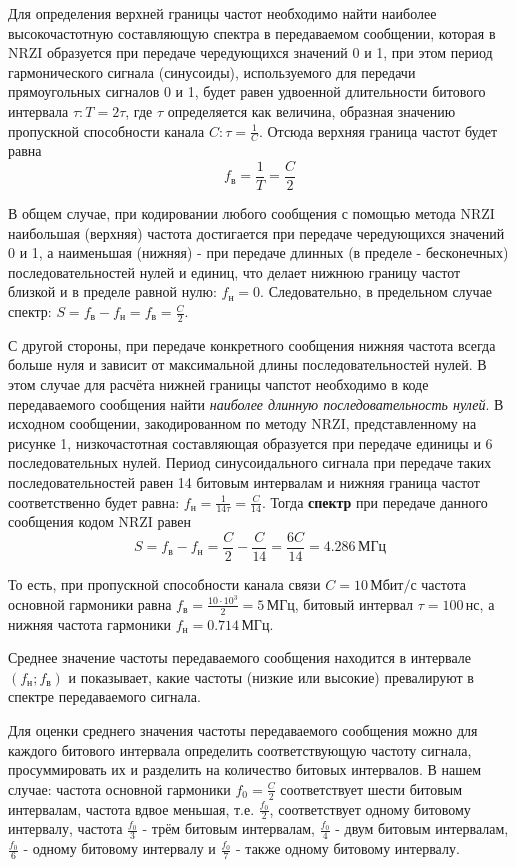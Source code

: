 Для определения верхней границы частот необходимо найти наиболее высокочастотную составляющую спектра в передаваемом сообщении, которая в NRZI образуется при передаче чередующихся значений 0 и 1, при этом период гармонического сигнала (синусоиды), используемого для передачи прямоугольных сигналов 0 и 1, будет равен удвоенной длительности битового интервала $\tau: T = 2\tau$, где $\tau$ определяется как величина, образная значению пропускной способности канала $C: \tau = \frac{1}{C}$. Отсюда верхняя граница частот будет равна \[f_{\text{в}} = \frac{1}{T} = \frac{C}{2}\]


В общем случае, при кодировании любого сообщения с помощью метода NRZI наибольшая (верхняя) частота достигается при передаче чередующихся значений 0 и 1, а наименьшая (нижняя) - при передаче длинных (в пределе - бесконечных) последовательностей нулей и единиц, что делает нижнюю границу частот близкой и в пределе равной нулю: $f_{\text{н}} = 0$. Следовательно, в предельном случае спектр: $S = f_{\text{в}} - f_{\text{н}} = f_{\text{в}} = \frac{C}{2}$.

С другой стороны, при передаче конкретного сообщения нижняя частота всегда больше нуля и зависит от максимальной длины последовательностей нулей. В этом случае для расчёта нижней границы чапстот необходимо в коде передаваемого сообщения найти \textit{наиболее длинную последовательность нулей}. В исходном сообщении, закодированном по методу NRZI, представленному на рисунке 1, низкочастотная составляющая образуется при передаче единицы и 6 последовательных нулей. Период синусоидального сигнала при передаче таких последовательностей равен 14 битовым интервалам и нижняя граница частот соответственно будет равна: $f_{\text{н}} = \frac{1}{14\tau} = \frac{C}{14}$. Тогда \textbf{спектр} при передаче данного сообщения кодом NRZI равен
\[
	S =  f_{\text{в}} - f_{\text{н}} = \frac{C}{2} - \frac{C}{14} = \frac{6C}{14} = 4.286 \, \text{МГц}
\]

То есть, при пропускной способности канала связи $C = 10 \, \text{Мбит/с}$ частота основной гармоники равна $f_{\text{в}} = \frac{10 \cdot 10^3}{2} = 5 \, \text{МГц}$, битовый интервал $\tau = 100 \, \text{нс}$, а нижняя частота гармоники $f_{\text{н}} = 0.714 \, \text{МГц}$.

Среднее значение частоты передаваемого сообщения находится в интервале $(f_{\text{н}};f_{\text{в}})$ и показывает, какие частоты (низкие или высокие) превалируют в спектре передаваемого сигнала.

Для оценки среднего значения частоты передаваемого сообщения можно для каждого битового интервала определить соответствующую частоту сигнала, просуммировать их и разделить на количество битовых интервалов. В нашем случае: частота основной гармоники $f_0 = \frac{C}{2}$ соответствует шести битовым интервалам, частота вдвое меньшая, т.е. $\frac{f_0}{2}$, соответствует одному битовому интервалу, частота $\frac{f_0}{3}$ - трём битовым интервалам, $\frac{f_0}{4}$ - двум битовым интервалам, $\frac{f_0}{6}$ - одному битовому интервалу и $\frac{f_0}{7}$ - также одному битовому интервалу.

